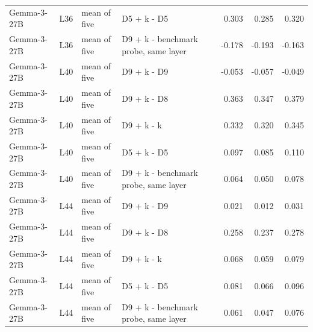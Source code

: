 \begin{table}
\begin{tabular}{llllrrr}
Gemma-3-27B & L36 & mean of five & D5 + k - D5 & 0.303 & 0.285 & 0.320 \\
Gemma-3-27B & L36 & mean of five & D9 + k - benchmark probe, same layer & -0.178 & -0.193 & -0.163 \\
Gemma-3-27B & L40 & mean of five & D9 + k - D9 & -0.053 & -0.057 & -0.049 \\
Gemma-3-27B & L40 & mean of five & D9 + k - D8 & 0.363 & 0.347 & 0.379 \\
Gemma-3-27B & L40 & mean of five & D9 + k - k & 0.332 & 0.320 & 0.345 \\
Gemma-3-27B & L40 & mean of five & D5 + k - D5 & 0.097 & 0.085 & 0.110 \\
Gemma-3-27B & L40 & mean of five & D9 + k - benchmark probe, same layer & 0.064 & 0.050 & 0.078 \\
Gemma-3-27B & L44 & mean of five & D9 + k - D9 & 0.021 & 0.012 & 0.031 \\
Gemma-3-27B & L44 & mean of five & D9 + k - D8 & 0.258 & 0.237 & 0.278 \\
Gemma-3-27B & L44 & mean of five & D9 + k - k & 0.068 & 0.059 & 0.079 \\
Gemma-3-27B & L44 & mean of five & D5 + k - D5 & 0.081 & 0.066 & 0.096 \\
Gemma-3-27B & L44 & mean of five & D9 + k - benchmark probe, same layer & 0.061 & 0.047 & 0.076 \\
\bottomrule
\end{tabular}
\end{table}
